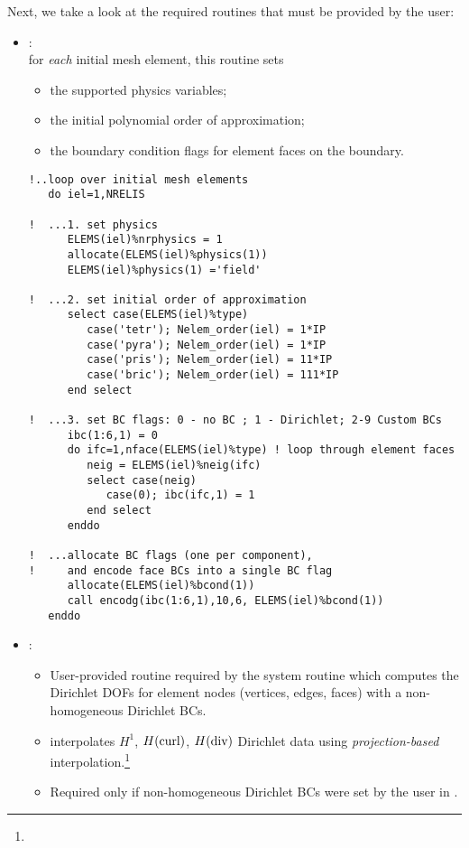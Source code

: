 Next, we take a look at the required routines that must be provided by the user:
\begin{itemize}
	\itemsep 0pt
	\item
	{:\\
	for \emph{each} initial mesh element, this routine sets
	\begin{itemize}
		\itemsep 0pt
		\item the supported physics variables;
		\item the initial polynomial order of approximation;
		\item the boundary condition flags for element faces on the boundary.
	\end{itemize}
\begin{lstlisting}[caption=\file{POISSON/GALERKIN/}\routine{set\_initial\_mesh} routine.]
!..loop over initial mesh elements
   do iel=1,NRELIS

!  ...1. set physics
      ELEMS(iel)%nrphysics = 1
      allocate(ELEMS(iel)%physics(1))
      ELEMS(iel)%physics(1) ='field'

!  ...2. set initial order of approximation
      select case(ELEMS(iel)%type)
         case('tetr'); Nelem_order(iel) = 1*IP
         case('pyra'); Nelem_order(iel) = 1*IP
         case('pris'); Nelem_order(iel) = 11*IP
         case('bric'); Nelem_order(iel) = 111*IP
      end select

!  ...3. set BC flags: 0 - no BC ; 1 - Dirichlet; 2-9 Custom BCs
      ibc(1:6,1) = 0
      do ifc=1,nface(ELEMS(iel)%type) ! loop through element faces
         neig = ELEMS(iel)%neig(ifc)
         select case(neig)
            case(0); ibc(ifc,1) = 1
         end select
      enddo

!  ...allocate BC flags (one per component), 
!     and encode face BCs into a single BC flag
      allocate(ELEMS(iel)%bcond(1))
      call encodg(ibc(1:6,1),10,6, ELEMS(iel)%bcond(1))
   enddo
\end{lstlisting}
	}
	\item
	{:
	\begin{itemize}
	\item User-provided routine required by the system routine  which computes the Dirichlet DOFs for element nodes (vertices, edges, faces) with a non-homogeneous Dirichlet BCs. 
	\item {} interpolates $H^1$, $H(\text{curl})$, $H(\text{div})$ Dirichlet data using \emph{projection-based} interpolation.\footnote{}
	\item Required only if non-homogeneous Dirichlet BCs were set by the user in .
\end{itemize}

}
\end{itemize}
